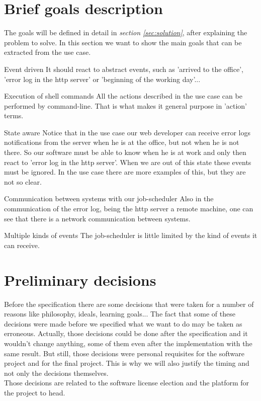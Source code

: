 \section{Brief goals description}
\label{bgoals}
The goals will be defined in detail in \emph{section \ref{sec:solution}}, after explaining the problem to solve. In this section
we want to show the main goals that can be extracted from the use case.\\
\begin{list}{-}{}
  \item Event driven
    \subitem It should react to abstract events, such as 'arrived to the office', 'error log in the http server' or 'beginning of the working 
      day'...
  \item Execution of shell commands
    \subitem All the actions described in the use case can be performed by command-line. That is what makes it general purpose in 'action'
      terms.
  \item State aware
    \subitem Notice that in the use case our web developer can receive error logs notifications from the server when he is at the office,
      but not when he is not there. So our software must be able to know when he is at work and only then react to 'error log in the http
      server'. When we are out of this state these events must be ignored. In the use case there are more examples of this, but they are
      not so clear.
  \item Communication between systems with our job-scheduler
    \subitem Also in the communication of the error log, being the http server a remote machine, one can see that there is a network 
      communication between systems.
  \item Multiple kinds of events
    \subitem The job-scheduler is little limited by the kind of events it can receive.
\end{list}

\section{Preliminary decisions}
\label{sec:preli}
Before the specification there are some decisions that were taken for a number of reasons like philosophy, ideals, learning goals... 
The fact that some of these decisions were made before we specified what we want to do may be taken as erroneous. Actually, those decisions
could be done after the specification and it wouldn't change anything, some of them even after the implementation with the same result. But
still, those decisions were personal requisites for the software project and for the final project. This is why we will also justify the 
timing and not only the decisions themselves.\\
Those decisions are related to the software license election and the platform for the project to head.
